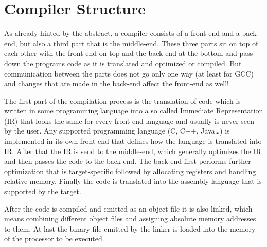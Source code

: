 \chapter{Compiler Structure}
\label{chapter:compiler structure}
As already hinted by the abstract, a compiler consists of a front-end and a back-end, but also a third part that is the middle-end. These three parts sit on top of each other with the front-end on top and the back-end at the bottom and pass down the programs code as it is translated and optimized or compiled. But communication between the parts does not go only one way (at least for GCC)
and changes that are made in the back-end affect the front-end as well!

The first part of the compilation process is the translation of code which is written in some programming language into a so called Immediate Representation (IR) that looks the same for every front-end language and usually is never seen by the user. Any supported programming language (C, C++, Java…) is implemented in its own front-end that defines how the language is translated into IR. After that the IR is send to the middle-end, which generally optimizes the IR and then passes the code to the back-end. The back-end first performs further optimization that is target-specific followed by allocating registers and handling relative memory. Finally the code is translated into the assembly language that is supported by the target.

After the code is compiled and emitted as an object file it is also linked, which means combining different object files and assigning absolute memory addresses to them. At last the binary file emitted by the linker is loaded into the memory of the processor to be executed.
